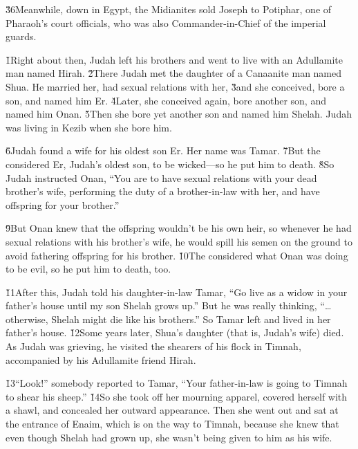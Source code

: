 \v{36}Meanwhile, down in Egypt, the Midianites sold Joseph to Potiphar, one of Pharaoh's court officials, who was also Commander-in-Chief of the imperial guards.

\v{1}Right about then, Judah left his brothers and went to live with an Adullamite man named Hirah. \v{2}There Judah met the daughter of a Canaanite man named Shua. He married her, had sexual relations with her, \v{3}and she conceived, bore a son, and named him Er. \v{4}Later, she conceived again, bore another son, and named him Onan. \v{5}Then she bore yet another son and named him Shelah. Judah was living in Kezib when she bore him.

\v{6}Judah found a wife for his oldest son Er. Her name was Tamar. \v{7}But the  considered Er, Judah's oldest son, to be wicked---so he put him to death. \v{8}So Judah instructed Onan, ``You are to have sexual relations with your dead brother's wife, performing the duty of a brother-in-law with her, and have offspring for your brother.''

\v{9}But Onan knew that the offspring wouldn't be his own heir, so whenever he had sexual relations with his brother's wife, he would spill his semen on the ground to avoid fathering offspring for his brother. \v{10}The  considered what Onan was doing to be evil, so he put him to death, too.

\v{11}After this, Judah told his daughter-in-law Tamar, ``Go live as a widow in your father's house until my son Shelah grows up.'' But he was really thinking, ``{\ldots}otherwise, Shelah might die like his brothers.'' So Tamar left and lived in her father's house. \v{12}Some years later, Shua's daughter (that is, Judah's wife) died. As Judah was grieving, he visited the shearers of his flock in Timnah, accompanied by his Adullamite friend Hirah.

\v{13}``Look!'' somebody reported to Tamar, ``Your father-in-law is going to Timnah to shear his sheep.'' \v{14}So she took off her mourning apparel, covered herself with a shawl, and concealed her outward appearance. Then she went out and sat at the entrance of Enaim, which is on the way to Timnah, because she knew that even though Shelah had grown up, she wasn't being given to him as his wife.

